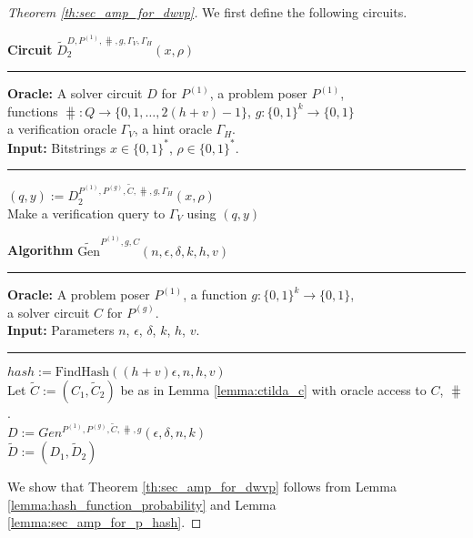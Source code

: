 %
\begin{proof}[Theorem \ref{th:sec_amp_for_dwvp}]
We first define the following circuits.
%
\begin{codeblock}
  \textbf{Circuit} $\widetilde{D}_2^{D, P^{(1)}, \hash, g, \Gamma_V, \Gamma_H}(x, \rho)$
  \medskip
  \hrule
  \medskip
  \textbf{Oracle:} A solver circuit $D$ for $P^{(1)}$, a problem poser $P^{(1)}$, \\
  \IndII functions $\hash: Q \rightarrow \{0,1, \dots, 2(h+v) - 1\}$, $g: \{0,1\}^{k} \rightarrow \{0,1\}$ \\
  \IndII a verification oracle $\Gamma_V$, a hint oracle $\Gamma_H$.\\
  \textbf{Input:}  Bitstrings $x \in \{0,1\}^{*}$, $\rho \in \{0,1\}^{*}$.
  \medskip\hrule\medskip
  $(q, y) := D_2^{P^{(1)}, P^{(g)}, \widetilde{C}, \hash, g, \Gamma_H}(x, \rho)$ \\
  Make a verification query to $\Gamma_V$ using $(q,y)$
\end{codeblock}
%
\begin{codeblock}
  \textbf{Algorithm} $\widetilde{\text{Gen}}^{P^{(1)}, g, C}(n, \epsilon, \delta, k, h, v)$
  \medskip \hrule \medskip
  \textbf{Oracle:} A problem poser $P^{(1)}$, a function $g: \{0,1\}^{k} \rightarrow \{0,1\}$, \\
  \IndII a solver circuit $C$ for $P^{(g)}$.  \\
  \textbf{Input:} Parameters $n$, $\epsilon$, $\delta$, $k$, $h$, $v$.
  \medskip\hrule\medskip
  $hash := \text{FindHash}((h+v)\epsilon, n, h, v)$ \\
  Let $\widetilde{C} := (C_1, \widetilde{C}_2)$ be as in Lemma \ref{lemma:ctilda_c} with oracle access to $C$, $\hash$. \\
  $D := Gen^{P^{(1)}, P^{(g)}, \widetilde{C}, \hash, g}(\epsilon, \delta, n, k)$ \\
  \Return $\widetilde{D} := (D_1, \widetilde{D}_2)$
\end{codeblock}
%
We show that Theorem \ref{th:sec_amp_for_dwvp} follows from Lemma \ref{lemma:hash_function_probability} and Lemma \ref{lemma:sec_amp_for_p_hash}.

\end{proof}

